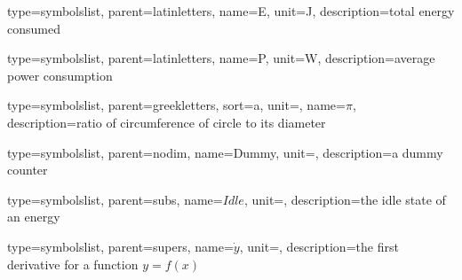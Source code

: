 

%
%


{
	type=symbolslist,
	parent=latinletters,
	name={E},
	unit={\si{\joule}},
	description={total energy consumed}
}

{
	type=symbolslist,
	parent=latinletters,
	name={P},
	unit={\si{\watt}},
	description={average power consumption}
}


{
	type=symbolslist,
	parent=greekletters,
	sort=a,
	unit={},
	name={\ensuremath{\pi}},
	description={ratio of circumference of circle to its diameter}
}

{
	type=symbolslist,
	parent=nodim,
	name={Dummy},
	unit={},
	description={a dummy counter}
}

{
	type=symbolslist,
	parent=subs,
	name={\ensuremath{Idle}},
	unit={},
	description={the idle state of an energy}
}


{
	type=symbolslist,
	parent=supers,
	name={\ensuremath{\dot{y}}},
	unit={},
	description={the first derivative for a function $y=f(x)$}
}
